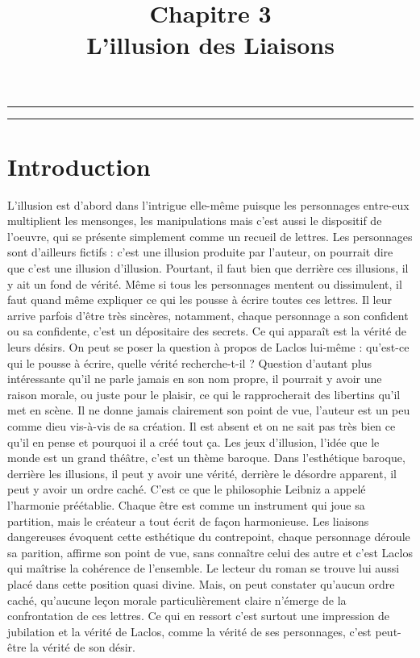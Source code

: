 \documentclass[12pt]{article}
\title{Chapitre 3\\\large L'illusion des Liaisons}
\date{}
\author{}
\begin{document}
\maketitle
\thispagestyle{fancy}

\hrule
\tableofcontents
\hrule
{}
\pagebreak
\section*{\color{red}Introduction}
L'illusion est d'abord dans l'intrigue elle-même puisque les personnages entre-eux multiplient les mensonges, les manipulations mais c'est aussi le dispositif de l'oeuvre, qui se présente simplement comme un recueil de lettres.
Les personnages sont d'ailleurs fictifs : c'est une illusion produite par l'auteur, on pourrait dire que c'est une illusion d'illusion.
Pourtant, il faut bien que derrière ces illusions, il y ait un fond de vérité.
Même si tous les personnages mentent ou dissimulent, il faut quand même expliquer ce qui les pousse à écrire toutes ces lettres.
Il leur arrive parfois d'être très sincères, notamment, chaque personnage a son confident ou sa confidente, c'est un dépositaire des secrets.
Ce qui apparaît est la vérité de leurs désirs.
On peut se poser la question à propos de Laclos lui-même : qu'est-ce qui le pousse à écrire, quelle vérité recherche-t-il ?
Question d'autant plus intéressante qu'il ne parle jamais en son nom propre, il pourrait y avoir une raison morale, ou juste pour le plaisir, ce qui le rapprocherait des libertins qu'il met en scène.
Il ne donne jamais clairement son point de vue, l'auteur est un peu comme dieu vis-à-vis de sa création.
Il est absent et on ne sait pas très bien ce qu'il en pense et pourquoi il a créé tout ça.
Les jeux d'illusion, l'idée que le monde est un grand théâtre, c'est un thème baroque.
Dans l'esthétique baroque, derrière les illusions, il peut y avoir une vérité, derrière le désordre apparent, il peut y avoir un ordre caché.
C'est ce que le philosophie Leibniz a appelé l'harmonie préétablie.
Chaque être est comme un instrument qui joue sa partition, mais le créateur a tout écrit de façon harmonieuse.
Les liaisons dangereuses évoquent cette esthétique du contrepoint, chaque personnage déroule sa parition, affirme son point de vue, sans connaître celui des autre et c'est Laclos qui maîtrise la cohérence de l'ensemble.
Le lecteur du roman se trouve lui aussi placé dans cette position quasi divine.
Mais, on peut constater qu'aucun ordre caché, qu'aucune leçon morale particulièrement claire n'émerge de la confrontation de ces lettres.
Ce qui en ressort c'est surtout une impression de jubilation et la vérité de Laclos, comme la vérité de ses personnages, c'est peut-être la vérité de son désir.
\end{document}
